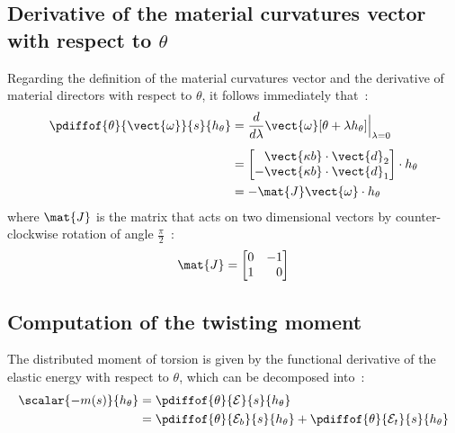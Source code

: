 \subsection{Derivative of the material curvatures vector with respect to $\theta$}
Regarding the definition of the material curvatures vector and the derivative of material directors with respect to $\theta$, it follows immediately that~:
\begin{equation}
\begin{aligned}
	\pdiffof{\theta}{\vect{\omega}}{s}{h_\theta}
	&= \frac{d}{d\lambda} \vect{\omega}[\theta + \lambda h_\theta]\Bigr|_{\lambda = 0}
	\\[0.5em]
	&= \begin{bmatrix*}[r]
		\vect{\kappa b}\cdot\vect{d}_2\\
		-\vect{\kappa b}\cdot\vect{d}_1\\
	\end{bmatrix*}\cdot h_\theta \\
	&= - \mat{J}\vect{\omega}\cdot h_\theta
\end{aligned}
\label{eq:DthetaW}
\end{equation}
where $\mat{J}$ is the matrix that acts on two dimensional vectors by counter-clockwise rotation of angle $\frac{\pi}{2}$~:
\begin{equation}
	\mat{J} = \begin{bmatrix*}[r]
			0	&	-1\\
			1	&	0\\
		\end{bmatrix*}
\end{equation}

\subsection{Computation of the twisting moment}

The distributed moment of torsion is given by the functional derivative of the elastic energy with respect to $\theta$, which can be decomposed into~:
\begin{equation}
	\begin{aligned}
	\scalar{-m(s)}{h_\theta}
	&= \pdiffof{\theta}{\mathcal{E}}{s}{h_\theta} \\
	&= \pdiffof{\theta}{\mathcal{E}_b}{s}{h_\theta} + \pdiffof{\theta}{\mathcal{E}_t}{s}{h_\theta}
	\end{aligned}
\label{eq:mintdef}
\end{equation}

